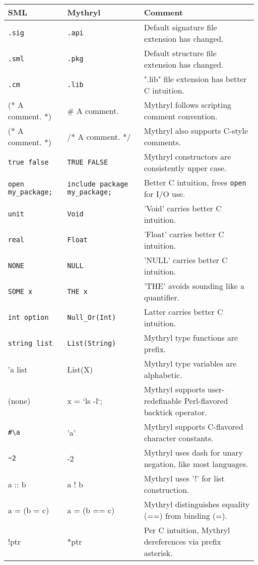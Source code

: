 \begin{tabular}{|l|l|l|} \hline
{\bf SML} & {\bf Mythryl} & {\bf Comment} \\ \hline \hline
{\tt .sig} & {\tt .api} & Default signature file extension has changed. \\ \hline
{\tt .sml} & {\tt .pkg} & Default structure file extension has changed. \\ \hline
{\tt .cm} & {\tt .lib} & ".lib" file extension has better C intuition. \\ \hline
(* A comment. *) & \# A comment. & Mythryl follows scripting comment convention. \\ \hline
(* A comment. *) & /* A comment. */ & Mythryl also supports C-style comments. \\ \hline
{\tt true false} & {\tt TRUE FALSE} & Mythryl constructors are consistently upper case. \\ \hline
{\tt open my\_package;} & {\tt include package   my\_package;} & Better C intuition, frees {\tt open} for I/O use. \\ \hline
{\tt unit} & {\tt Void} & 'Void' carries better C intuition. \\ \hline
{\tt real} & {\tt Float} & 'Float' carries better C intuition. \\ \hline
{\tt NONE} & {\tt NULL} & 'NULL' carries better C intuition. \\ \hline
{\tt SOME x} & {\tt THE x} & 'THE' avoids sounding like a quantifier. \\ \hline
{\tt int option} & {\tt Null\_Or(Int)} & Latter carries better C intuition. \\ \hline
{\tt string list} & {\tt List(String)} & Mythryl type functions are prefix. \\ \hline
'a list & List(X) & Mythryl type variables are alphabetic. \\ \hline
(none) & x = `ls -l`; & Mythryl supports user-redefinable Perl-flavored backtick operator. \\ \hline
\verb|#\a| & 'a' & Mythryl supports C-flavored character constants. \\ \hline
\verb|~2| & -2 & Mythryl uses dash for unary negation, like most languages. \\ \hline
a :: b & a ! b & Mythryl uses '!' for list construction. \\ \hline
a = (b = c) & a = (b == c) & Mythryl distinguishes equality (==) from binding (=). \\ \hline
!ptr & *ptr & Per C intuition, Mythryl dereferences via prefix asterisk. \\ \hline

\end{tabular}
